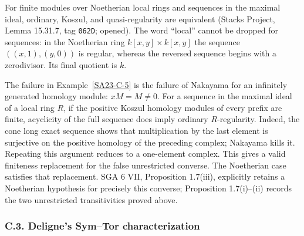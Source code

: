 \begin{remark}\label{SA23-C-6}
For finite modules over Noetherian local rings and sequences in the
maximal ideal, ordinary, Koszul, and quasi-regularity are equivalent
(Stacks Project, Lemma 15.31.7, tag \texttt{062D}; opened).
The word ``local'' cannot be dropped for sequences: in the Noetherian
ring $k[x,y]\times k[x,y]$ the sequence
$((x,1),(y,0))$ is regular, whereas the reversed sequence begins with
a zerodivisor.  Its final quotient is $k$.

The failure in Example~\ref{SA23-C-5} is the failure of Nakayama for an
infinitely generated homology module: $xM=M\ne0$.
For a sequence in the maximal ideal of a local ring $R$, if the
positive Koszul homology modules of every prefix are finite,
acyclicity of the full sequence does imply ordinary $R$-regularity.
Indeed, the cone long exact sequence shows
that multiplication by the last element is surjective on the positive
homology of the preceding complex; Nakayama kills it.  Repeating this
argument reduces to a one-element complex.  This gives a valid
finiteness replacement for the false unrestricted converse.  The
Noetherian case satisfies that replacement.  SGA 6 VII, Proposition
1.7(iii), explicitly retains a Noetherian hypothesis for precisely this
converse; Proposition 1.7(i)--(ii) records the two unrestricted
transitivities proved above.
\end{remark}

\subsubsection{C.3. Deligne's Sym--Tor characterization}

